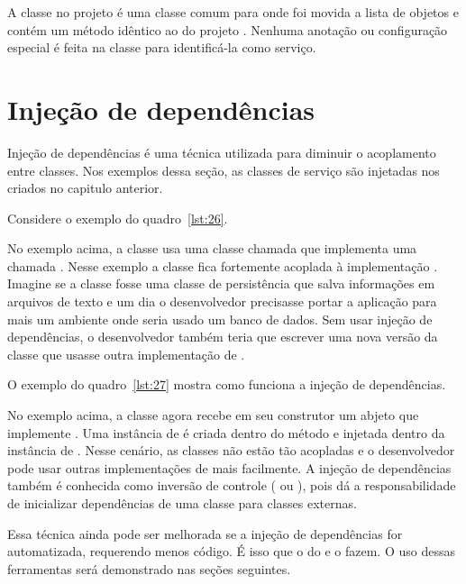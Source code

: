A classe  no projeto  é uma classe comum para onde foi movida a lista de objetos  e contém um método idêntico ao do projeto . Nenhuma anotação ou configuração especial é feita na classe para identificá-la como serviço.

\section{Injeção de dependências}

Injeção de dependências é uma técnica utilizada para diminuir o acoplamento entre classes. Nos exemplos dessa seção, as classes de serviço são injetadas nos  criados no capitulo anterior. 

Considere o exemplo do quadro~\ref{lst:26}.


No exemplo acima, a classe  usa uma classe chamada  que implementa uma  chamada . Nesse exemplo a classe  fica fortemente acoplada à implementação . Imagine se a classe  fosse uma classe de persistência que salva informações em arquivos de texto e um dia o desenvolvedor precisasse portar a aplicação para mais um ambiente onde seria usado um banco de dados. Sem usar injeção de dependências, o desenvolvedor também teria que escrever uma nova versão da classe  que usasse outra implementação de .

O exemplo do quadro~\ref{lst:27} mostra como funciona a injeção de dependências.


No exemplo acima, a classe  agora recebe em seu construtor um abjeto que implemente . Uma instância de  é criada dentro do método  e injetada dentro da instância de . Nesse cenário, as classes não estão tão acopladas e o desenvolvedor pode usar outras implementações de  mais facilmente. A injeção de dependências também é conhecida como inversão de controle ( ou ), pois dá a responsabilidade de inicializar dependências de uma classe para classes externas. 

Essa técnica ainda pode ser melhorada se a injeção de dependências for automatizada, requerendo menos código. É isso que o  do  e o  fazem. O uso dessas ferramentas será demonstrado nas seções seguintes.

